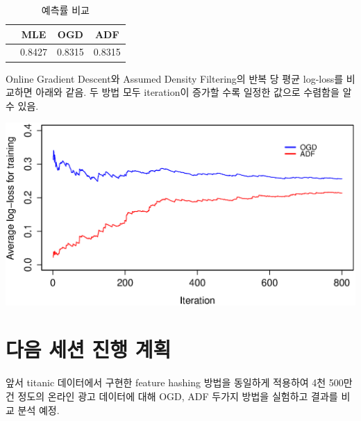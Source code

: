 \documentclass[oneside,b5paper,11pt]{article} %
\begin{document}
\begin{table}[ht]
	\caption{예측률 비교 }
	\centering
	\begin{tabular}{c c c c}
	\hline\hline
	\textbf{} & \textbf{MLE} & \textbf{OGD} & \textbf{ADF}\\
	\hline
	  & 0.8427 & 0.8315 & 0.8315 \\
	\hline
	\end{tabular}
\end{table}


 Online Gradient Descent와 Assumed Density Filtering의 반복 당 평균 log-loss를 비교하면 아래와 같음. 두 방법 모두 iteration이 증가할 수록 일정한 값으로 수렴함을 알 수 있음.

\includegraphics[scale=0.55]{titanic_ogd_adf.eps} %

\section{다음 세션 진행 계획}
 앞서 titanic 데이터에서 구현한 feature hashing 방법을 동일하게 적용하여 4천 500만건 정도의 온라인 광고 데이터에 대해 OGD, ADF 두가지 방법을 실험하고 결과를 비교 분석 예정.
\end{document}
